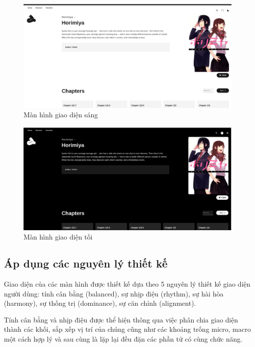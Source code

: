 \documentclass[./../main.tex]{subfiles}
\begin{document}
\begin{figure}[H]
	\centering
	\includegraphics[width=\linewidth]{./images/image5.png}
	\caption{Màn hình giao diện sáng}
\end{figure}

\begin{figure}[H]
	\centering
	\includegraphics[width=\linewidth]{./images/image2.png}
	\caption{Màn hình giao diện tối}
\end{figure}

\subsection{Áp dụng các nguyên lý thiết kế}

Giao diện của các màn hình được thiết kế dựa theo 5 nguyên lý thiết kế giao diện người dùng: tính cân bằng (balanced), sự nhịp điệu (rhythm), sự hài hòa (harmony), sự thống trị (dominance), sự căn chỉnh (alignment).

Tính cân bằng và nhịp điệu được thể hiện thông qua việc phân chia giao diện thành các khối, sắp xếp vị trí của chúng cũng như các khoảng trống micro, macro một cách hợp lý và sau cùng là lặp lại đều đặn các phần tử có cùng chức năng.
\end{document}
